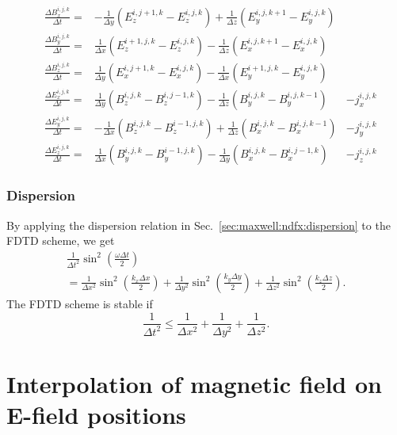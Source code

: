 \documentclass[12pt,a4paper,DIV=calc]{scrartcl}
\begin{document}
\begin{align}
    &\frac{\Delta B_x^{i,j,k}}{\Delta t} =& -\frac{1}{\Delta y}\left(E_z^{i,j+1,k} - E_z^{i,j,k} \right) +\frac{1}{\Delta z} \left(E_y^{i,j,k+1} - E_y^{i,j,k}\right) \\
    &\frac{\Delta B_y^{i,j,k}}{\Delta t} =& \frac{1}{\Delta x}\left(E_z^{i+1,j,k} - E_z^{i,j,k} \right) - \frac{1}{\Delta z} \left(E_x^{i,j,k+1} - E_x^{i,j,k}\right) \\
    &\frac{\Delta B_z^{i,j,k}}{\Delta t} =& \frac{1}{\Delta y}\left(E_x^{i,j+1,k} - E_x^{i,j,k} \right) - \frac{1}{\Delta x} \left(E_y^{i+1,j,k} - E_y^{i,j,k}\right) \\
    &\frac{\Delta E_x^{i,j,k}}{\Delta t} = &\frac{1}{\Delta y}\left(B_z^{i,j,k} - B_z^{i,j-1,k} \right) - \frac{1}{\Delta z}\left(B_y^{i,j,k}-B_y^{i,j,k-1}\right) &- j_x^{i,j,k}\\
    &\frac{\Delta E_y^{i,j,k}}{\Delta t} =& -\frac{1}{\Delta x}\left(B_z^{i,j,k} - B_z^{i-1,j,k}\right) + \frac{1}{\Delta z}\left(B_x^{i,j,k} - B_x^{i,j,k-1}\right) &- j_y^{i,j,k}\\
    &\frac{\Delta E_z^{i,j,k}}{\Delta t} =& \frac{1}{\Delta x}\left(B_y^{i,j,k} - B_y^{i-1,j,k}\right) - \frac{1}{\Delta y}\left(B_x^{i,j,k} - B_x^{i,j-1,k}\right) &- j_z^{i,j,k}
\end{align}

\subsubsection{Dispersion}
\label{sec:maxwell:fdtd:dispersion}

By applying the dispersion relation in Sec.~\ref{sec:maxwell:ndfx:dispersion} to the FDTD scheme, we get
\begin{multline}
    \frac{1}{\Delta t^2}\sin^2\left(\frac{\omega \Delta t}{2}\right) \\ 
    = \frac{1}{\Delta x^2}\sin^2\left(\frac{k_x \Delta x}{2}\right) + \frac{1}{\Delta y^2}\sin^2\left(\frac{k_y \Delta y}{2}\right) + \frac{1}{\Delta z^2}\sin^2\left(\frac{k_z \Delta z}{2}\right).
\end{multline}
The FDTD scheme is stable if
\begin{equation}
    \frac{1}{\Delta t^2} \leq \frac{1}{\Delta x^2} + \frac{1}{\Delta y^2} + \frac{1}{\Delta z^2}.
\end{equation}

\section{Interpolation of magnetic field on E-field positions}
\end{document}

